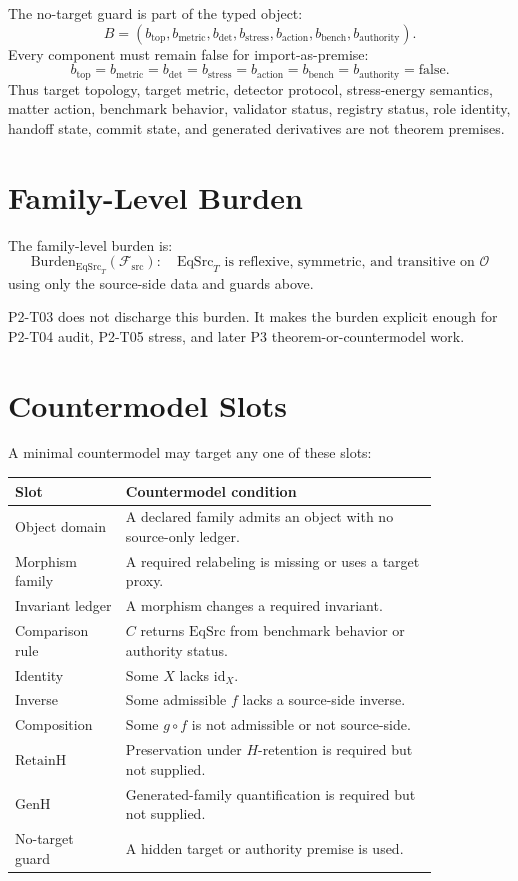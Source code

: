 \documentclass[11pt]{article}
\newcommand{\EqSrc}{\mathrm{EqSrc}}
\newcommand{\RetainH}{\mathrm{RetainH}}
\newcommand{\GenH}{\mathrm{GenH}}
\begin{document}
The no-target guard is part of the typed object:
\[
  B=(b_{\mathrm{top}},b_{\mathrm{metric}},b_{\mathrm{det}},
  b_{\mathrm{stress}},b_{\mathrm{action}},b_{\mathrm{bench}},
  b_{\mathrm{authority}}).
\]
Every component must remain false for import-as-premise:
\[
  b_{\mathrm{top}}=b_{\mathrm{metric}}=b_{\mathrm{det}}=
  b_{\mathrm{stress}}=b_{\mathrm{action}}=b_{\mathrm{bench}}=
  b_{\mathrm{authority}}=\mathrm{false}.
\]
Thus target topology, target metric, detector protocol, stress-energy
semantics, matter action, benchmark behavior, validator status, registry
status, role identity, handoff state, commit state, and generated derivatives
are not theorem premises.

\section{Family-Level Burden}

The family-level burden is:
\[
  \mathrm{Burden}_{\EqSrc_T}(\mathcal{F}_{\mathrm{src}}):
  \quad \EqSrc_T \text{ is reflexive, symmetric, and transitive on }
  \mathcal{O}
\]
using only the source-side data and guards above.

P2-T03 does not discharge this burden. It makes the burden explicit enough for
P2-T04 audit, P2-T05 stress, and later P3 theorem-or-countermodel work.

\section{Countermodel Slots}

A minimal countermodel may target any one of these slots:
\begin{center}
\begin{tabular}{|p{0.22\linewidth}|p{0.62\linewidth}|}
\hline
Slot & Countermodel condition \\
\hline
Object domain & A declared family admits an object with no source-only ledger. \\
\hline
Morphism family & A required relabeling is missing or uses a target proxy. \\
\hline
Invariant ledger & A morphism changes a required invariant. \\
\hline
Comparison rule & \(C\) returns \(\EqSrc\) from benchmark behavior or authority status. \\
\hline
Identity & Some \(X\) lacks \(\mathrm{id}_X\). \\
\hline
Inverse & Some admissible \(f\) lacks a source-side inverse. \\
\hline
Composition & Some \(g\circ f\) is not admissible or not source-side. \\
\hline
\(\RetainH\) & Preservation under \(H\)-retention is required but not supplied. \\
\hline
\(\GenH\) & Generated-family quantification is required but not supplied. \\
\hline
No-target guard & A hidden target or authority premise is used. \\
\hline
\end{tabular}
\end{center}
\end{document}
